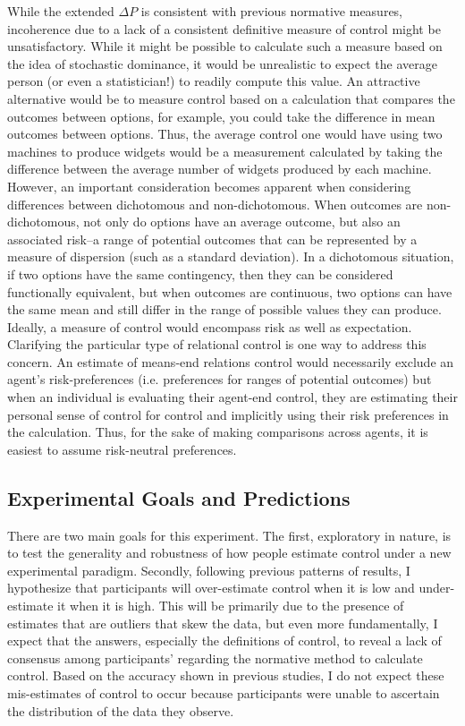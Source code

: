 \documentclass[USenglish,letterpaper,12pt,extrafontsizes,oneside,onecolumn,final]{memoir}
\newcommand{\deltap}{$\Delta P$}
\begin{document}
While the extended \deltap \xspace is consistent with previous normative measures, incoherence due to a lack of a consistent definitive measure of control might be unsatisfactory.  While it might be possible to calculate such a measure based on the idea of stochastic dominance, it would be unrealistic to expect the average person (or even a statistician!) to readily compute this value. An attractive alternative would be to measure control based on a calculation that compares the outcomes between options, for example, you could take the difference in mean outcomes between options. Thus, the average control one would have using two machines to produce widgets would be a measurement calculated by taking the difference between the average number of widgets produced by each machine. However, an important consideration becomes apparent when considering differences between dichotomous and non-dichotomous.  When outcomes are non-dichotomous, not only do options have an average outcome, but also an associated risk--a range of potential outcomes that can be represented by a measure of dispersion (such as a standard deviation). In a dichotomous situation, if two options have the same contingency, then they can be considered functionally equivalent, but when outcomes are continuous, two options can have the same mean and still differ in the range of possible values they can produce. Ideally, a measure of control would encompass risk as well as expectation. Clarifying the particular type of relational control is one way to address this concern. An estimate of means-end relations control would necessarily exclude an agent's risk-preferences (i.e. preferences for ranges of potential outcomes) but when an individual is evaluating their agent-end control, they are estimating their personal sense of control for control and implicitly using their risk preferences in the calculation.  Thus, for the sake of making comparisons across agents, it is easiest to assume risk-neutral preferences. 

\subsection{Experimental Goals and Predictions}

There are two main goals for this experiment.  The first, exploratory in nature, is to test the generality and robustness of how people estimate control under a new experimental paradigm. Secondly, following previous patterns of results, I hypothesize that participants will over-estimate control when it is low and under-estimate it when it is high. This will be primarily due to the presence of estimates that are outliers that skew the data, but even more fundamentally, I expect that the answers, especially the definitions of control, to reveal a lack of consensus among participants' regarding the normative method to calculate control. Based on the accuracy shown in previous studies, I do not expect these mis-estimates of control to occur because participants were unable to ascertain the distribution of the data they observe. 
\end{document}
